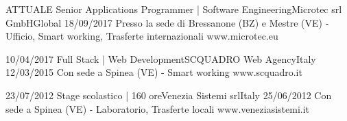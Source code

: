 
\begin{experiences}
    \experience
    {ATTUALE} {Senior Applications Programmer | Software Engineering}{Microtec srl GmbH}{Global}
    {18/09/2017} {Presso la sede di Bressanone (BZ) e Mestre (VE) - Ufficio, Smart working, Trasferte internazionali}
    {www.microtec.eu}
    \emptySeparator

    \experience
    {10/04/2017} {Full Stack | Web Development}{SCQUADRO Web Agency}{Italy}
    {12/03/2015} {Con sede a Spinea (VE) - Smart working}
    {www.scquadro.it}
    \emptySeparator

    \experience
    {23/07/2012} {Stage scolastico | 160 ore}{Venezia Sistemi srl}{Italy}
    {25/06/2012} {Con sede a Spinea (VE) - Laboratorio, Trasferte locali}
    {www.veneziasistemi.it}
\end{experiences}
